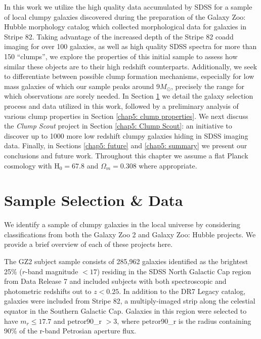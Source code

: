 In this work we utilize the high quality data accumulated by SDSS for a sample of local clumpy galaxies discovered during the preparation of the Galaxy Zoo: Hubble morphology catalog which collected morphological data for galaxies in Stripe 82. Taking advantage of the increased depth of the Stripe 82 coadd imaging for over 100 galaxies, as well as high quality SDSS spectra for more than 150 ``clumps'', we explore the properties of this initial sample to assess how similar these objects are to their high redshift counterparts. Additionally, we seek to differentiate between possible clump formation mechanisms, especially for low mass galaxies of which our sample peaks around $9M_{\odot}$, precisely the range for which observations are sorely needed. In Section \ref{chap5: data} we detail the galaxy selection process and data utilized in this work, followed by a preliminary analysis of various clump properties in Section \ref{chap5: clump properties}. We next discuss the \textit{Clump Scout} project in Section \ref{chap5: Clump Scout}: an initiative to discover up to 1000 more low redshift clumpy galaxies hiding in SDSS imaging data. Finally, in Sections \ref{chap5: future} and \ref{chap5: summary} we present our conclusions and future work. Throughout this chapter we assume a flat Planck cosmology with H$_0=67.8$ and $\Omega_m = 0.308$ where appropriate. 


\section{Sample Selection \& Data} \label{chap5: data}

We identify a sample of clumpy galaxies in the local universe by considering classifications from both the Galaxy Zoo 2 \citep[GZ2][]{Willett2013} and Galaxy Zoo: Hubble \citep[GZH][]{Willett2017} projects. We provide a brief overview of each of these projects here. 

The GZ2 subject sample consists of 285,962 galaxies identified as the brightest 25\% ($r$-band magnitude $< 17$) residing in the SDSS North Galactic Cap region from Data Release 7 and included subjects with both spectroscopic and photometric redshifts out to $z < 0.25$. In addition to the DR7 Legacy catalog, galaxies were included from Stripe 82, a multiply-imaged strip along the celestial equator in the Southern Galactic Cap. Galaxies in this region were selected to have $m_r\le17.7$ and petror90\_r $>3$, where petror90\_r is the radius containing 90\% of the r-band Petrosian aperture flux.


